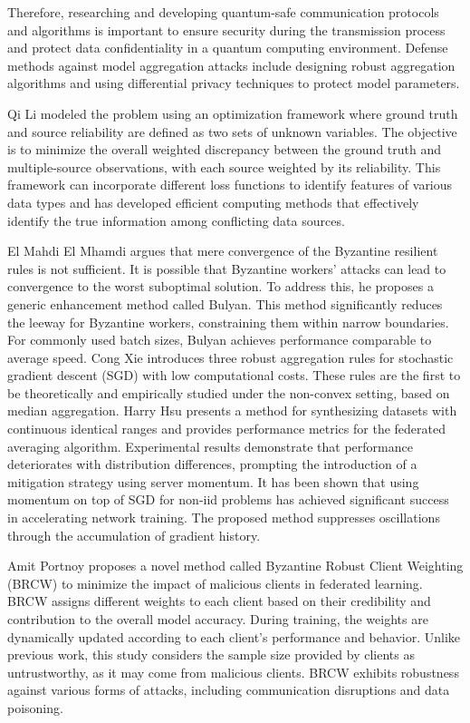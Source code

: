 \documentclass[conference]{IEEEtran}
\begin{document}
Therefore, researching and developing
quantum-safe communication protocols and algorithms is important to
ensure security during the transmission process and protect data confidentiality in a quantum computing environment.
Defense methods against model aggregation attacks include designing robust aggregation algorithms and
using differential privacy techniques to protect model parameters.


Qi Li \cite{b122} modeled the problem using an optimization framework where ground truth and
source reliability are defined as two sets of unknown variables. The objective
is to minimize the overall weighted discrepancy between the ground truth and
multiple-source observations, with each source weighted by its reliability.
This framework can incorporate different loss functions to identify features
of various data types and has developed efficient computing methods that
effectively identify the true information among conflicting data sources.


El Mahdi El Mhamdi \cite{b120} argues that mere convergence of the Byzantine resilient rules is not sufficient.
It is possible that Byzantine workers' attacks can lead to convergence to the worst suboptimal solution.
To address this, he proposes a generic enhancement method called Bulyan.
This method significantly reduces the leeway for Byzantine workers, constraining
them within narrow boundaries. For commonly used batch sizes, Bulyan achieves performance comparable to average speed.
Cong Xie \cite{b121} introduces three robust aggregation rules for stochastic
gradient descent (SGD) with low computational costs.
These rules are the first to be theoretically and empirically studied under the non-convex setting, based on median aggregation.
Harry Hsu \cite{b123} presents a method for synthesizing datasets
with continuous identical ranges and provides performance metrics for the federated averaging algorithm.
Experimental results demonstrate that performance deteriorates with distribution differences,
prompting the introduction of a mitigation strategy using server momentum.
It has been shown that using momentum on top of SGD for non-iid problems has
achieved significant success in accelerating network training.
The proposed method suppresses oscillations through the accumulation of gradient history.


Amit Portnoy \cite{b133} proposes a novel method called Byzantine
Robust Client Weighting (BRCW) to minimize the impact of
malicious clients in federated learning. BRCW assigns different
weights to each client based on their credibility and contribution
to the overall model accuracy. During training, the weights are dynamically updated according to
each client's performance and behavior. Unlike previous work, this study considers the sample
size provided by clients as untrustworthy, as it may come from malicious clients.
BRCW exhibits robustness against various forms of attacks, including communication disruptions and data poisoning.
\end{document}
